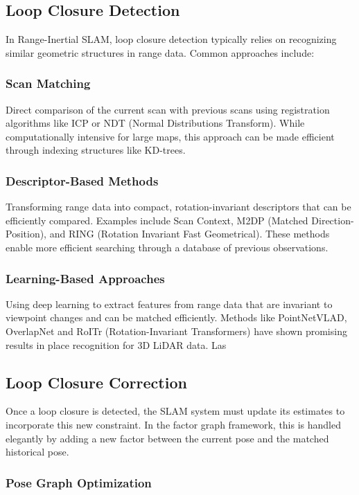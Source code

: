 \documentclass[journal]{IEEEtran}
\begin{document}
\subsection{Loop Closure Detection}

In Range-Inertial SLAM, loop closure detection typically relies on recognizing similar geometric structures in range data. Common approaches include:

\subsubsection{\textbf{Scan Matching}}
Direct comparison of the current scan with previous scans using registration algorithms like ICP or NDT (Normal Distributions Transform). While computationally intensive for large maps, this approach can be made efficient through indexing structures like KD-trees.


\subsubsection{\textbf{Descriptor-Based Methods}}
Transforming range data into compact, rotation-invariant descriptors that can be efficiently compared. Examples include Scan Context, M2DP (Matched Direction-Position), and RING (Rotation Invariant Fast Geometrical). These methods enable more efficient searching through a database of previous observations.


\subsubsection{\textbf{Learning-Based Approaches}}
Using deep learning to extract features from range data that are invariant to viewpoint changes and can be matched efficiently. Methods like PointNetVLAD, OverlapNet and RoITr (Rotation-Invariant Transformers) have shown promising results in place recognition for 3D LiDAR data. Las

\subsection{Loop Closure Correction}

Once a loop closure is detected, the SLAM system must update its estimates to incorporate this new constraint. In the factor graph framework, this is handled elegantly by adding a new factor between the current pose and the matched historical pose.

\subsubsection{Pose Graph Optimization}
\end{document}
